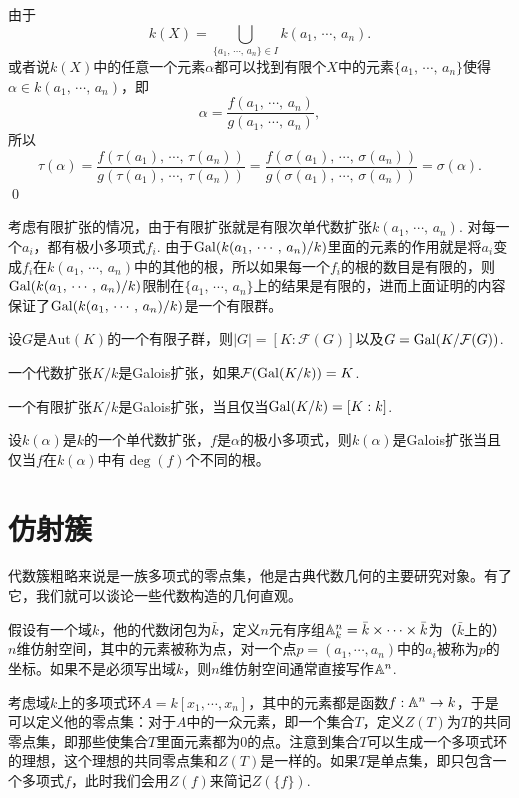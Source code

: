 \proof 
	由于\[
		k(X)=\bigcup_{\{a_1,\,\cdots,\,a_n\}\in I} k(a_1,\,\cdots,\,a_n).
	\]
	或者说$k(X)$中的任意一个元素$\alpha$都可以找到有限个$X$中的元素$\{a_1,\,\cdots,\,a_n\}$使得$\alpha\in k(a_1,\,\cdots,\,a_n)$，即
	\[
		\alpha=\frac{f(a_1,\,\cdots,\,a_n)}{g(a_1,\,\cdots,\,a_n)},
	\]
	所以
	\[
		\tau(\alpha)=\frac{f(\tau(a_1),\,\cdots,\,\tau(a_n))}{g(\tau(a_1),\,\cdots,\,\tau(a_n))}=\frac{f(\sigma(a_1),\,\cdots,\,\sigma(a_n))}{g(\sigma(a_1),\,\cdots,\,\sigma(a_n))}=\sigma(\alpha).
	\]
\qed

考虑有限扩张的情况，由于有限扩张就是有限次单代数扩张$k(a_1,\,\cdots,\,a_n)$. 对每一个$a_i$，都有极小多项式$f_i$. 由于$\operatorname{Gal}(k(a_1,\,\cdots,\,a_n)/k)$里面的元素的作用就是将$a_i$变成$f_i$在$k(a_1,\,\cdots,\,a_n)$中的其他的根，所以如果每一个$f_i$的根的数目是有限的，则$\operatorname{Gal}(k(a_1,\,\cdots,\,a_n)/k)$限制在$\{a_1,\,\cdots,\,a_n\}$上的结果是有限的，进而上面证明的内容保证了$\operatorname{Gal}(k(a_1,\,\cdots,\,a_n)/k)$是一个有限群。

\pro 设$G$是$\mathrm{Aut}(K)$的一个有限子群，则$|G|=[K:\mathcal{F}(G)]$以及$G=\operatorname{Gal}(K/\mathcal{F}(G))$.

\para 一个代数扩张$K/k$是Galois扩张，如果$\mathcal{F}(\operatorname{Gal}(K/k))=K$.

\pro 一个有限扩张$K/k$是Galois扩张，当且仅当$\operatorname{Gal}(K/k)=[K:k]$.

\pro 设$k(\alpha)$是$k$的一个单代数扩张，$f$是$\alpha$的极小多项式，则$k(\alpha)$是Galois扩张当且仅当$f$在$k(\alpha)$中有$\deg(f)$个不同的根。

\section{仿射簇}

代数簇粗略来说是一族多项式的零点集，他是古典代数几何的主要研究对象。有了它，我们就可以谈论一些代数构造的几何直观。

\para 假设有一个域$k$，他的代数闭包为$\bar{k}$，定义$n$元有序组$\mathbb{A}^n_k=\bar{k}\times \cdots \times \bar{k}$为（$\bar{k}$上的）$n$维仿射空间，其中的元素被称为点，对一个点$p=(a_1,\cdots ,a_n)$中的$a_i$被称为$p$的坐标。如果不是必须写出域$k$，则$n$维仿射空间通常直接写作$\mathbb{A}^n$.

考虑域$k$上的多项式环$A=k[x_1,\cdots ,x_n]$，其中的元素都是函数$f:\mathbb{A}^n\to k$，于是可以定义他的零点集：对于$A$中的一众元素，即一个集合$T$，定义$Z(T)$为$T$的共同零点集，即那些使集合$T$里面元素都为$0$的点。注意到集合$T$可以生成一个多项式环的理想，这个理想的共同零点集和$Z(T)$是一样的。如果$T$是单点集，即只包含一个多项式$f$，此时我们会用$Z(f)$来简记$Z(\{f\})$.

